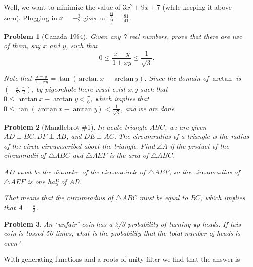 \documentclass[12pt]{scrartcl}
\newtheorem{a_problem}{Problem}
\begin{document}
\begin{soln}
	Well, we want to minimize the value of $3x^2 + 9x + 7$
	(while keeping it above zero). Plugging in $x = -\frac{3}{2}$ gives us
	$\frac{\frac{81}{4}}{\frac{41}{4}} = \frac{81}{41}$.
\end{soln}
\setcounter{a_problem}{504}
\begin{a_problem}[Canada 1984]
	Given any 7 real numbers, prove that there are two of them, say
	$x$ and $y$, such that
	\[0 \leq \frac{x-y}{1+xy} \leq \frac{1}{\sqrt{3}}.\]
	\begin{soln}
		Note that $\frac{x-y}{1+xy} = \tan ( \arctan x - \arctan y )$.
		Since the domain of $\arctan$ is $(-\frac{\pi}{2},\frac{\pi}{2})$, 
		by pigeonhole there must exist $x,y$ such that 
		$0 \leq \arctan x - \arctan y < \frac{\pi}{6}$, which implies that
		$0 \leq \tan (\arctan x - \arctan y) < \frac{1}{\sqrt{3}}$, and
		we are done.
	\end{soln}
\end{a_problem}
\begin{a_problem}[Mandlebrot \#1]
	In acute triangle $ABC$, we are given $AD \perp BC, DF \perp AB$, and
	$DE \perp AC$. The circumradius of a triangle is the radius of the 
	circle circumscribed about the triangle. Find $\angle A$ if the product
	of the circumradii of $\triangle ABC$ and $\triangle AEF$ is the area of
	$\triangle ABC$.
	\begin{soln}
		$AD$ must be the diameter of the circumcircle of $\triangle AEF$, so
		the circumradius of $\triangle AEF$ is one half of $AD$.

		That means that the circumradius of $\triangle ABC$ must be equal to 
		$BC$, which implies that $A = \frac{\pi}{3}$.
	\end{soln}
\end{a_problem}
\begin{a_problem}
	An ``unfair'' coin has a 2/3 probability of turning up heads. 
	If this coin is tossed 50 times, what is the probability that the 
	total number of heads is even?
\end{a_problem}
\begin{soln}
	With generating functions and a roots of unity filter we find that the
	answer is 
\end{soln}
\end{document}
